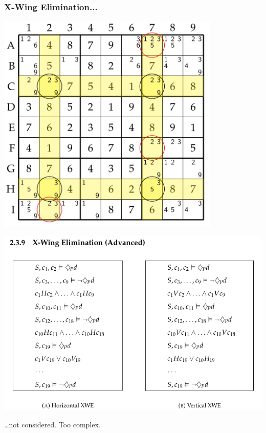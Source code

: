 \documentclass[aspectratio=169, usenames, dvipsnames]{beamer}
\begin{document}
\begin{frame}
\frametitle{X-Wing Elimination...}

\begin{minipage}{0.45\textwidth}
\begin{center}
\includegraphics[width=0.8\textwidth, keepaspectratio]{images/xwing.png} 
\end{center}
\end{minipage}\begin{minipage}{0.55\textwidth}
\begin{center}
\includegraphics[width=\textwidth, keepaspectratio]{images/strategy_nd_xwing.png} 
\end{center}
\end{minipage}

\pause\bigskip

\begin{center}
\large
\dots not considered. Too complex.
\end{center}
\end{frame}
\end{document}
